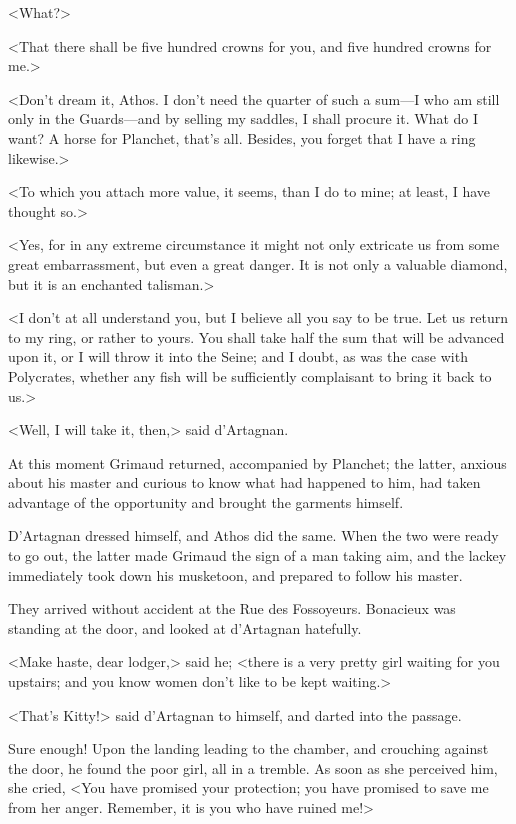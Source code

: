 <What?> 

<That there shall be five hundred crowns for you, and five hundred crowns for me.> 

<Don't dream it, Athos. I don't need the quarter of such a sum---I who am still only in the Guards---and by selling my saddles, I shall procure it. What do I want? A horse for Planchet, that's all. Besides, you forget that I have a ring likewise.> 

<To which you attach more value, it seems, than I do to mine; at least, I have thought so.> 

<Yes, for in any extreme circumstance it might not only extricate us from some great embarrassment, but even a great danger. It is not only a valuable diamond, but it is an enchanted talisman.> 

<I don't at all understand you, but I believe all you say to be true. Let us return to my ring, or rather to yours. You shall take half the sum that will be advanced upon it, or I will throw it into the Seine; and I doubt, as was the case with Polycrates, whether any fish will be sufficiently complaisant to bring it back to us.> 

<Well, I will take it, then,> said d'Artagnan. 

At this moment Grimaud returned, accompanied by Planchet; the latter, anxious about his master and curious to know what had happened to him, had taken advantage of the opportunity and brought the garments himself. 

D'Artagnan dressed himself, and Athos did the same. When the two were ready to go out, the latter made Grimaud the sign of a man taking aim, and the lackey immediately took down his musketoon, and prepared to follow his master. 

They arrived without accident at the Rue des Fossoyeurs. Bonacieux was standing at the door, and looked at d'Artagnan hatefully. 

<Make haste, dear lodger,> said he; <there is a very pretty girl waiting for you upstairs; and you know women don't like to be kept waiting.> 

<That's Kitty!> said d'Artagnan to himself, and darted into the passage. 

Sure enough! Upon the landing leading to the chamber, and crouching against the door, he found the poor girl, all in a tremble. As soon as she perceived him, she cried, <You have promised your protection; you have promised to save me from her anger. Remember, it is you who have ruined me!> 

